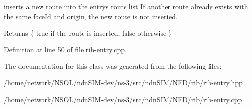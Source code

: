 inserts a new route into the entry\textquotesingle{}s route list If another route already exists with the same face\+Id and origin, the new route is not inserted. 

\begin{DoxyReturn}{Returns}
\{ true if the route is inserted, false otherwise \} 
\end{DoxyReturn}


Definition at line 50 of file rib-\/entry.\+cpp.



The documentation for this class was generated from the following files\+:\begin{DoxyCompactItemize}
\item 
/home/network/\+N\+S\+O\+L/ndn\+S\+I\+M-\/dev/ns-\/3/src/ndn\+S\+I\+M/\+N\+F\+D/rib/rib-\/entry.\+hpp\item 
/home/network/\+N\+S\+O\+L/ndn\+S\+I\+M-\/dev/ns-\/3/src/ndn\+S\+I\+M/\+N\+F\+D/rib/rib-\/entry.\+cpp\end{DoxyCompactItemize}
